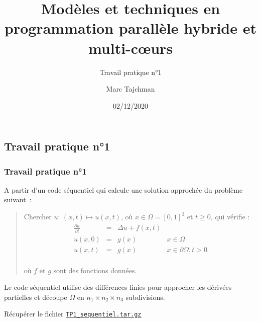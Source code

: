 \documentclass{beamer}
\title{Modèles et techniques en programmation parallèle hybride et multi-c\oe urs}
\subtitle{Travail pratique n°1}
\author{Marc Tajchman}\institute{CEA - DEN/DM2S/STMF/LMES}
\date{02/12/2020}
\newcommand\Frac[2]{\frac{\displaystyle #1}{\displaystyle #2}}
\begin{document}
\begin{frame}
	\titlepage
\end{frame}

\large
\begin{frame}
	\section{Travail pratique n°1}
	\frametitle{Travail pratique n°1}

A partir d'un code séquentiel qui calcule une solution approchée du problème suivant~:

\medskip
\begin{quote}
Chercher $u$:  $(x, t) \mapsto u(x, t)$, où  $x \in \Omega = [0,1]^3$ et $t \geq 0$, qui vérifie :
$$
\begin{array}{lcll}
\Frac{\partial u}{\partial t} & = & \Delta u + f(x, t) & \\[0.3cm]
u(x, 0) &=& g(x) & x\in \Omega \\[0.3cm]
u(x, t) & = & g(x) & x\in\partial \Omega, t > 0\\[0.3cm]
\end{array}
$$

\vspace{-0.6cm}
où $f$ et $g$ sont des fonctions données.
\end{quote}

Le code séquentiel utilise des différences finies pour approcher les dérivées partielles et découpe $\Omega$ en $n_1\times n_2\times n_3$ subdivisions.

Récupérer le fichier \href{https://perso.ensta-paris.fr/~tajchman/Seance3/TP1_sequentiel.tar.gz}{\tt TP1\_sequentiel.tar.gz}
\end{frame}
\end{document}
